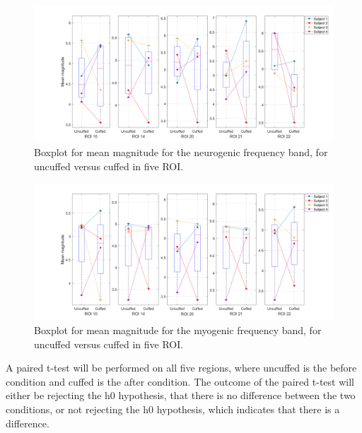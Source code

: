 \begin{figure}[H]
	\includegraphics[width=1\textwidth]{figures/boxplot_neuro}
	\caption{Boxplot for mean magnitude for the neurogenic frequency band, for uncuffed versus cuffed in five ROI.}
	\label{fig:boxNeuro}
\end{figure}

\begin{figure}[H]
	\includegraphics[width=1\textwidth]{figures/boxplot_myo}
	\caption{Boxplot for mean magnitude for the myogenic frequency band, for uncuffed versus cuffed in five ROI.}
	\label{fig:boxMyo}
\end{figure}

A paired t-test will be performed on all five regions, where uncuffed is the before condition and cuffed is the after condition. The outcome of the paired t-test will either be rejecting the h0 hypothesis, that there is no difference between the two conditions, or not rejecting the h0 hypothesis, which indicates that there is a difference.
 
